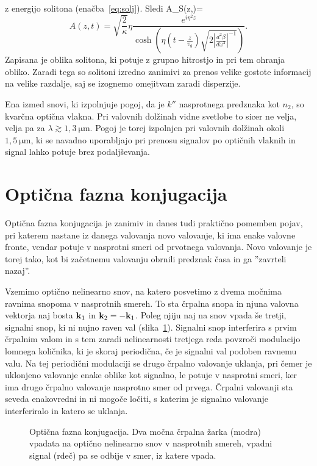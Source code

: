 z energijo solitona (enačba~\ref{eq:solj}). Sledi 
\beq
A_S\left(z,\tau\right)=\eta{}\,
\eeq
\begin{equation}
A\left(z,t\right)=\sqrt{\frac{2}{\kappa}}\eta\frac{e^{i\eta^{2}z}}{{\cosh}\left(\eta (t-\frac{z}{v_g}) 
\sqrt{2\left|\frac{d^{2}\beta}{d\omega^{2}}\right|^{-1}}\right)}.
\label{8.96}
\end{equation}
Zapisana je oblika solitona, ki potuje z grupno hitrostjo in pri tem ohranja obliko. Zaradi tega
so solitoni izredno zanimivi za prenos velike gostote informacij na velike razdalje, saj se izognemo
omejitvam zaradi disperzije. 

\begin{remark}
Ena izmed snovi, ki izpolnjuje pogoj, da je $k''$ nasprotnega predznaka kot $n_2$, so kvarčna 
optična vlakna. Pri valovnih dolžinah vidne svetlobe to sicer ne velja, velja pa za 
$\lambda \gtrsim 1,3~\si{\micro\metre}$.
Pogoj je torej izpolnjen pri valovnih dolžinah okoli $1,5~\si{\micro\metre}$, ki se navadno uporabljajo 
pri prenosu signalov po optičnih vlaknih in signal lahko potuje brez podaljševanja. 
\end{remark}

\section{Optična fazna konjugacija}
Optična fazna konjugacija je zanimiv in danes tudi praktično pomemben
pojav, pri katerem nastane iz danega valovanja novo valovanje, ki ima enake valovne
fronte, vendar potuje v nasprotni smeri od prvotnega valovanja. Novo valovanje je torej tako,
kot bi začetnemu valovanju obrnili predznak časa in ga ''zavrteli nazaj''. 

Vzemimo optično nelinearno snov, na katero posvetimo z dvema močnima ravnima
snopoma v nasprotnih smereh. To sta črpalna snopa in njuna valovna vektorja 
naj bosta ${\bf k}_{1}$ in ${\bf k}_2 = -{\bf k}_{1}$. Poleg njiju naj na snov vpada
še tretji, signalni snop, ki ni nujno raven val (slika~\ref{08_OPC1}). 
Signalni snop interferira s prvim črpalnim valom in s tem zaradi nelinearnosti 
tretjega reda povzroči modulacijo lomnega količnika, ki je skoraj periodična, če
je signalni val podoben ravnemu valu. Na tej periodični modulaciji se
drugo črpalno valovanje uklanja, pri čemer je uklonjeno valovanje enake oblike
kot signalno, le potuje v nasprotni smeri, ker ima drugo črpalno valovanje
nasprotno smer od prvega. Črpalni valovanji sta seveda enakovredni in ni
mogoče ločiti, s katerim je signalno valovanje interferiralo in katero se
uklanja.
\begin{figure}[h]
\centering
\def\svgwidth{70truemm} 

\caption{Optična fazna konjugacija. Dva močna črpalna žarka (modra) vpadata 
na optično nelinearno snov v nasprotnih smereh, vpadni signal (rdeč) pa se odbije v 
smer, iz katere vpada.}
\label{08_OPC1}
\end{figure}

